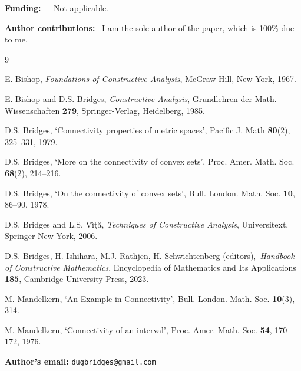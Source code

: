 \documentclass[11pt]{article}%
\begin{document}
\bigskip
%

\bigskip
%

\noindent
\textbf{Funding: \ \ }Not applicable.%

\noindent
\textbf{Author contributions: }\ I am the sole author of the paper, which is
100\% due to me.

\begin{thebibliography}{9}                                                                                                %


E. Bishop, \emph{Foundations of Constructive Analysis},
McGraw-Hill, New York, 1967.

E. Bishop and D.S. Bridges, \emph{Constructive Analysis},
Grundlehren der Math. Wissenschaften \textbf{279}, Springer-Verlag,
Heidelberg, 1985.

D.S. Bridges, `Connectivity properties of metric spaces',
Pacific J. Math \textbf{80}(2), 325--331, 1979.

D.S. Bridges, `More on the connectivity of convex sets',
Proc. Amer. Math. Soc. \textbf{68}(2), 214--216.

D.S. Bridges, `On the connectivity of convex sets', Bull.
London. Math. Soc. \textbf{10}, 86--90, 1978.

D.S. Bridges and L.S. V\^{\i}\c{t}\u{a}, \emph{Techniques of
Constructive Analysis}, Universitext, Springer New York, 2006.

D.S. Bridges, H. Ishihara, M.J. Rathjen, H. Schwichtenberg
(editors),\emph{\ Handbook of Constructive Mathematics}, Encyclopedia of
Mathematics and Its Applications \textbf{185}, Cambridge University Press, 2023.

M. Mandelkern, `An Example in Connectivity', Bull. London.
Math. Soc. \textbf{10}(3), 314.

M. Mandelkern, `Connectivity of an interval', Proc. Amer.
Math. Soc. \textbf{54}, 170-172, 1976.
\end{thebibliography}

%

\bigskip
%

\bigskip
%

\noindent
\textbf{Author's email: }\texttt{dugbridges@gmail.com}
\end{document}
